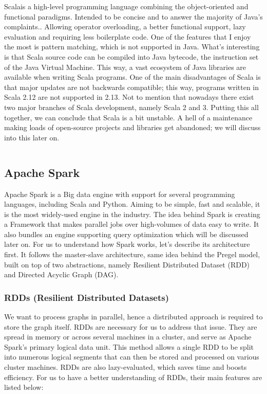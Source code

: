 Scala\footnotemark is a high-level programming language combining the object-oriented and functional paradigms. Intended to be concise and to answer the majority of Java's complaints.\footnotemark. Allowing operator overloading, a better functional support, lazy evaluation and requiring less boilerplate code. One of the features that I enjoy the most is pattern matching, which is not supported in Java. What's interesting is that Scala source code can be compiled into Java bytecode, the instruction set of the Java Virtual Machine. This way, a vast ecosystem of Java libraries are available when writing Scala programs. One of the main disadvantages of Scala is that major updates are not backwards compatible; this way, programs written in Scala 2.12 are not supported in 2.13. Not to mention that nowadays there exist two major branches of Scala development, namely Scala 2 and 3. Putting this all together, we can conclude that Scala is a bit unstable. A hell of a maintenance making loads of open-source projects and libraries get abandoned; we will discuss into this later on.

\begin{code}
    \inputminted{scala}{code/listings/7-1_helloWorld.scala}
\end{code}

\subsection{Apache Spark}

Apache Spark is a Big data engine with support for several programming languages, including Scala and Python. Aiming to be simple, fast and scalable, it is the most widely-used engine in the industry. The idea behind Spark is creating a Framework that makes parallel jobs over high-volumes of data easy to write. It also bundles an engine supporting query optimization which will be discussed later on. For us to understand how Spark works, let's describe its architecture first. It follows the master-slave architecture, same idea behind the Pregel model, built on top of two abstractions, namely Resilient Distributed Dataset (RDD) and Directed Acyclic Graph (DAG).

\subsubsection{RDDs (Resilient Distributed Datasets)}

We want to process graphs in parallel, hence a distributed approach is required to store the graph itself. RDDs are necessary for us to address that issue. They are spread in memory or across several machines in a cluster, and serve as Apache Spark's primary logical data unit. This method allows a single RDD to be split into numerous logical segments that can then be stored and processed on various cluster machines. RDDs are also lazy-evaluated, which saves time and boosts efficiency. For us to have a better understanding of RDDs, their main features are listed below:

